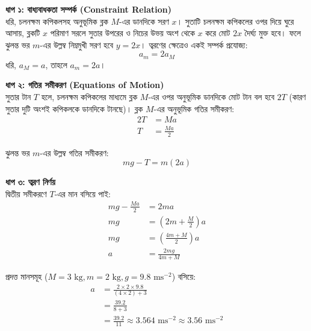 \documentclass[12pt, a4paper]{article}
\begin{document}
\begin{tcolorbox}[solutionbox={সমাধান (Solution)}]
    \noindent
    \textbf{ধাপ ১: বাধ্যবাধকতা সম্পর্ক (Constraint Relation)} \\
    ধরি, চলনক্ষম কপিকলসহ অনুভূমিক ব্লক $M$-এর ডানদিকে সরণ $x$। সুতাটি চলনক্ষম কপিকলের ওপর দিয়ে ঘুরে আসায়, ব্লকটি $x$ পরিমাণ সরলে সুতার উপরের ও নিচের উভয় অংশ থেকে $x$ করে মোট $2x$ দৈর্ঘ্য মুক্ত হবে। 
    ফলে ঝুলন্ত ভর $m$-এর উল্লম্ব নিম্নমুখী সরণ হবে $y = 2x$। ত্বরণের ক্ষেত্রেও একই সম্পর্ক প্রযোজ্য:
    \[ a_m = 2 a_M \]
    ধরি, $a_M = a$, তাহলে $a_m = 2a$।
    
    \vspace{0.5em}
    \noindent\textbf{ধাপ ২: গতির সমীকরণ (Equations of Motion)} \\
    সুতার টান $T$ হলে, চলনক্ষম কপিকলের মাধ্যমে ব্লক $M$-এর ওপর অনুভূমিক ডানদিকে মোট টান বল হবে $2T$ (কারণ সুতার দুটি অংশই কপিকলকে ডানদিকে টানছে)। 
    ব্লক $M$-এর অনুভূমিক গতির সমীকরণ:
    \begin{align*}
        2T &= M a \\
        T &= \frac{M a}{2}
    \end{align*}
    
    ঝুলন্ত ভর $m$-এর উল্লম্ব গতির সমীকরণ:
    \[ mg - T = m (2a) \]
    
    \vspace{0.5em}
    \noindent\textbf{ধাপ ৩: ত্বরণ নির্ণয়} \\
    দ্বিতীয় সমীকরণে $T$-এর মান বসিয়ে পাই:
    \begin{align*}
        mg - \frac{M a}{2} &= 2ma \\
        mg &= \left(2m + \frac{M}{2}\right) a \\
        mg &= \left(\frac{4m + M}{2}\right) a \\
        a &= \frac{2mg}{4m + M}
    \end{align*}
    
    প্রদত্ত মানসমূহ ($M = 3\text{ kg}, m = 2\text{ kg}, g = 9.8\text{ ms}^{-2}$) বসিয়ে:
    \begin{align*}
        a &= \frac{2 \times 2 \times 9.8}{(4 \times 2) + 3} \\
          &= \frac{39.2}{8 + 3} \\
          &= \frac{39.2}{11} \approx 3.564\text{ ms}^{-2} \approx \mathbf{3.56}\text{ ms}^{-2}
    \end{align*}
\end{tcolorbox}
\end{document}
